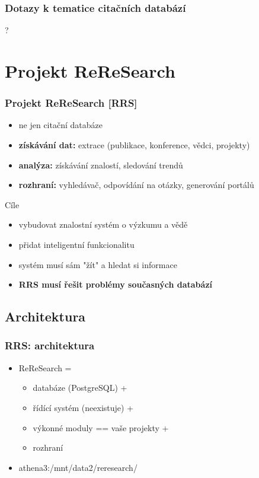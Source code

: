 \documentclass{beamer}
\begin{document}
\begin{frame}
  \frametitle{Dotazy k tematice citačních databází}
  {?}
\end{frame}


\section{Projekt ReReSearch}

\begin{frame}
  \frametitle{Projekt ReReSearch [RRS]}
  \begin{itemize}
    \item ne jen citační databáze
    \item {\textbf{získávání dat:} extrace (publikace, konference, vědci, projekty)}
    \item {\textbf{analýza:} získávání znalostí, sledování trendů}
    \item {\textbf{rozhraní:} vyhledávač, odpovídání na otázky, generování portálů}
  \end{itemize}
  \begin{block}{Cíle}
    \begin{itemize}
      \item vybudovat znalostní systém o výzkumu a vědě
      \item přidat inteligentní funkcionalitu
      \item systém musí sám "žít" a hledat si informace
      \item \textbf{RRS musí řešit problémy současných databází}
    \end{itemize}
  \end{block}
\end{frame}

\subsection{Architektura}
\begin{frame}
  \frametitle{RRS: architektura}
  \begin{itemize}
    \item ReReSearch =
      \begin{itemize}
        \item databáze (PostgreSQL) +
        \item řídící systém (neexistuje) +
        \item výkonné moduly == vaše projekty +
        \item rozhraní
      \end{itemize}
    \item athena3:/mnt/data2/reresearch/
  \end{itemize}
\end{frame}
\end{document}
